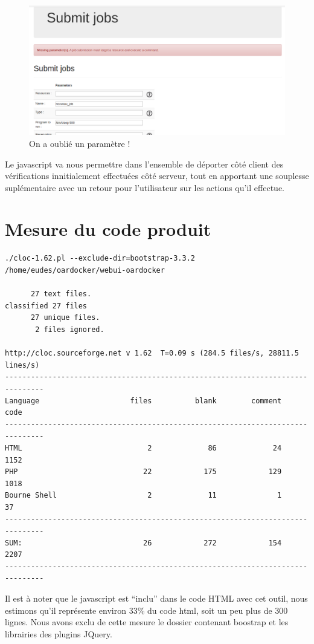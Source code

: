 \documentclass[a4paper,10pt]{article}
\begin{document}
\begin{figure}[h]
  \begin{center}
    \includegraphics[scale=0.3]{./job.png}
   \caption{\label{job} On a oublié un paramètre !}
  \end{center}
\end{figure}

Le javascript va nous permettre dans l'ensemble de déporter côté client des vérifications innitialement effectuées côté serveur, tout en apportant une souplesse suplémentaire avec un retour pour l'utilisateur sur les actions qu'il effectue.

\section{Mesure du code produit}
\begin{verbatim}
./cloc-1.62.pl --exclude-dir=bootstrap-3.3.2 /home/eudes/oardocker/webui-oardocker

      27 text files.
classified 27 files
      27 unique files.                              
       2 files ignored.

http://cloc.sourceforge.net v 1.62  T=0.09 s (284.5 files/s, 28811.5 lines/s)
-------------------------------------------------------------------------------
Language                     files          blank        comment           code
-------------------------------------------------------------------------------
HTML                             2             86             24           1152
PHP                             22            175            129           1018
Bourne Shell                     2             11              1             37
-------------------------------------------------------------------------------
SUM:                            26            272            154           2207
-------------------------------------------------------------------------------
\end{verbatim}
Il est à noter que le javascript est ``inclu'' dans le code HTML avec cet outil, nous estimons qu'il représente environ 33\% du code html, soit un peu plus de 300 lignes.
Nous avons exclu de cette mesure le dossier contenant boostrap et les librairies des plugins JQuery.
\newpage
\end{document}
